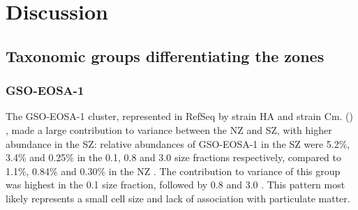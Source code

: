 \section{Discussion}

\subsection{Taxonomic groups differentiating the zones}

\subsubsection{GSO-EOSA-1}

The \ac{GSO-EOSA-1} cluster, represented in RefSeq by  strain HA and  strain Cm. () \cite{Walsh:2009fja}, made a large contribution to variance between the \ac{NZ} and \ac{SZ}, with higher abundance in the \ac{SZ}: relative abundances of \ac{GSO-EOSA-1} in the \ac{SZ} were 5.2\%, 3.4\% and 0.25\% in the 0.1, 0.8 and 3.0 \micron{} size fractions respectively, compared to 1.1\%, 0.84\% and 0.30\% in the \ac{NZ} .
The contribution to variance of this group was highest in the 0.1 \micron{} size fraction, followed by 0.8 \micron{} and 3.0 \micron{} .
This pattern most likely represents a small cell size and lack of association with particulate matter.

